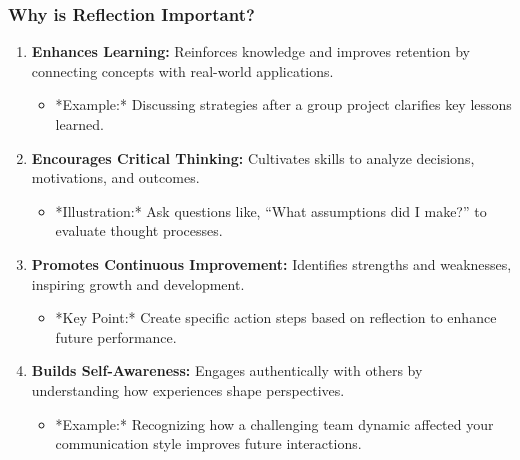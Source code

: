\documentclass[aspectratio=169]{beamer}
\begin{document}
\begin{frame}[fragile]
    \frametitle{Why is Reflection Important?}
    \begin{enumerate}
        \item \textbf{Enhances Learning:} Reinforces knowledge and improves retention by connecting concepts with real-world applications.
            \begin{itemize}
                \item *Example:* Discussing strategies after a group project clarifies key lessons learned.
            \end{itemize}
        
        \item \textbf{Encourages Critical Thinking:} Cultivates skills to analyze decisions, motivations, and outcomes.
            \begin{itemize}
                \item *Illustration:* Ask questions like, “What assumptions did I make?” to evaluate thought processes.
            \end{itemize}

        \item \textbf{Promotes Continuous Improvement:} Identifies strengths and weaknesses, inspiring growth and development.
            \begin{itemize}
                \item *Key Point:* Create specific action steps based on reflection to enhance future performance.
            \end{itemize}

        \item \textbf{Builds Self-Awareness:} Engages authentically with others by understanding how experiences shape perspectives.
            \begin{itemize}
                \item *Example:* Recognizing how a challenging team dynamic affected your communication style improves future interactions.
            \end{itemize}
    \end{enumerate}
\end{frame}
\end{document}
